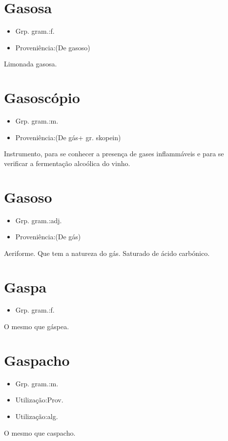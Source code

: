 \section{Gasosa}
\begin{itemize}
\item {Grp. gram.:f.}
\end{itemize}
\begin{itemize}
\item {Proveniência:(De \textunderscore gasoso\textunderscore )}
\end{itemize}
Limonada gasosa.
\section{Gasoscópio}
\begin{itemize}
\item {Grp. gram.:m.}
\end{itemize}
\begin{itemize}
\item {Proveniência:(De \textunderscore gás\textunderscore  + gr. \textunderscore skopein\textunderscore )}
\end{itemize}
Instrumento, para se conhecer a presença de gases inflammáveis e para se verificar a fermentação alcoólica do vinho.
\section{Gasoso}
\begin{itemize}
\item {Grp. gram.:adj.}
\end{itemize}
\begin{itemize}
\item {Proveniência:(De \textunderscore gás\textunderscore )}
\end{itemize}
Aeriforme.
Que tem a natureza do gás.
Saturado de ácido carbónico.
\section{Gaspa}
\begin{itemize}
\item {Grp. gram.:f.}
\end{itemize}
O mesmo que \textunderscore gáspea\textunderscore .
\section{Gaspacho}
\begin{itemize}
\item {Grp. gram.:m.}
\end{itemize}
\begin{itemize}
\item {Utilização:Prov.}
\end{itemize}
\begin{itemize}
\item {Utilização:alg.}
\end{itemize}
O mesmo que \textunderscore caspacho\textunderscore .
